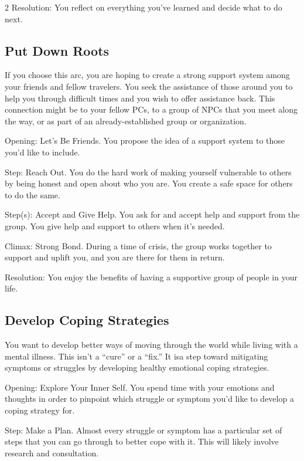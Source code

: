 \begin{multicols}{2}
Resolution: You reflect on everything you’ve learned and decide what to do next.

\subsection{Put Down Roots}

If you choose this arc, you are hoping to create a strong support system among your friends and fellow travelers. You seek the assistance of those around you to help you through difficult times and you wish to offer assistance back. This connection might be to your fellow PCs, to a group of NPCs that you meet along the way, or as part of an already-established group or organization.

Opening: Let’s Be Friends. You propose the idea of a support system to those you’d like to include.

Step: Reach Out. You do the hard work of making yourself vulnerable to others by being honest and open about who you are. You create a safe space for others to do the same.

Step(s): Accept and Give Help. You ask for and accept help and support from the group. You give help and support to others when it’s needed.

Climax: Strong Bond. During a time of crisis, the group works together to support and uplift you, and you are there for them in return.

Resolution: You enjoy the benefits of having a supportive group of people in your life.

\subsection{Develop Coping Strategies}

You want to develop better ways of moving through the world while living with a mental illness. This isn’t a “cure” or a “fix.” It isa step toward mitigating symptoms or struggles by developing healthy emotional coping strategies.

Opening: Explore Your Inner Self. You spend time with your emotions and thoughts in order to pinpoint which struggle or symptom you’d like to develop a coping strategy for.

Step: Make a Plan. Almost every struggle or symptom has a particular set of steps that you can go through to better cope with it. This will likely involve research and consultation.


\end{multicols}
